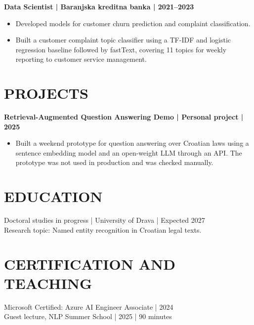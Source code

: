 \documentclass[11pt,a4paper]{article}
\begin{document}
\textbf{Data Scientist | Baranjska kreditna banka | 2021–2023}
\begin{itemize}
\item Developed models for customer churn prediction and complaint classification.
\item Built a customer complaint topic classifier using a TF-IDF and logistic regression baseline followed by fastText, covering 11 topics for weekly reporting to customer service management.
\end{itemize}

\section*{PROJECTS}
\textbf{Retrieval-Augmented Question Answering Demo | Personal project | 2025}
\begin{itemize}
\item Built a weekend prototype for question answering over Croatian laws using a sentence embedding model and an open-weight LLM through an API. The prototype was not used in production and was checked manually.
\end{itemize}

\section*{EDUCATION}
Doctoral studies in progress | University of Drava | Expected 2027\\
Research topic: Named entity recognition in Croatian legal texts.

\section*{CERTIFICATION AND TEACHING}
Microsoft Certified: Azure AI Engineer Associate | 2024\\
Guest lecture, NLP Summer School | 2025 | 90 minutes
\end{document}
